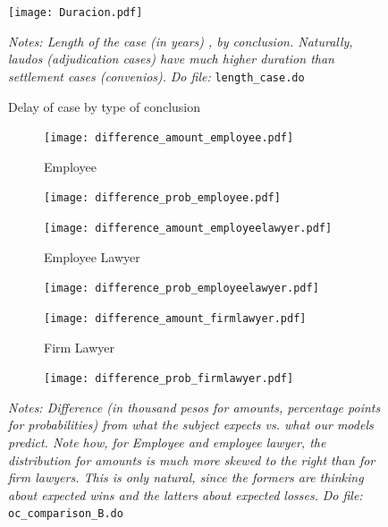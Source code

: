\documentclass[11pt]{article}
\begin{document}
  
\begin{figure}[H]
    \caption{Delay of case by type of conclusion}
    \label{DurationFig}
    \begin{center}
        \texttt{[image: Duracion.pdf]}
        \end{center}
    {\footnotesize \textit{Notes: Length of the case (in years) , by conclusion. Naturally, laudos (adjudication cases) have much higher duration than settlement cases (convenios).}}
    {\footnotesize \textit{Do file: } \texttt{length\_case.do}}
\end{figure}



\begin{figure}[H]
    \caption{Difference in what actor says and calculator predicts in amount and probability.}
    \label{Figure_overconfidence_exp}
    \begin{center}
    \begin{subfigure}{0.49\textwidth}
        \caption{Employee}
        \centering
        \texttt{[image: difference\_amount\_employee.pdf]}
    \end{subfigure}
     \begin{subfigure}{0.49\textwidth}
        \centering
        \texttt{[image: difference\_prob\_employee.pdf]}
    \end{subfigure}
    \begin{subfigure}{0.49\textwidth}
        \caption{Employee Lawyer}
        \centering
        \texttt{[image: difference\_amount\_employeelawyer.pdf]}
        \end{subfigure}
          \begin{subfigure}{0.49\textwidth}
        \centering
        \texttt{[image: difference\_prob\_employeelawyer.pdf]}
    \end{subfigure}
        \begin{subfigure}{0.49\textwidth}
            \caption{Firm Lawyer}
            \centering
            \texttt{[image: difference\_amount\_firmlawyer.pdf]}
    \end{subfigure}
    \begin{subfigure}{0.49\textwidth}
            \centering
            \texttt{[image: difference\_prob\_firmlawyer.pdf]}
        \end{subfigure}
    \end{center}
     \footnotesize \textit{Notes: Difference (in thousand pesos for amounts, percentage points for probabilities) from what the subject expects vs. what our models predict. Note how, for Employee and employee lawyer, the distribution for amounts is much more skewed to the right than for firm lawyers. This is only natural, since the formers are thinking about expected wins and the latters about expected losses.} 
      \footnotesize{ \textit{Do file: }  \texttt{oc\_comparison\_B.do}}
\end{figure}
\end{document}
